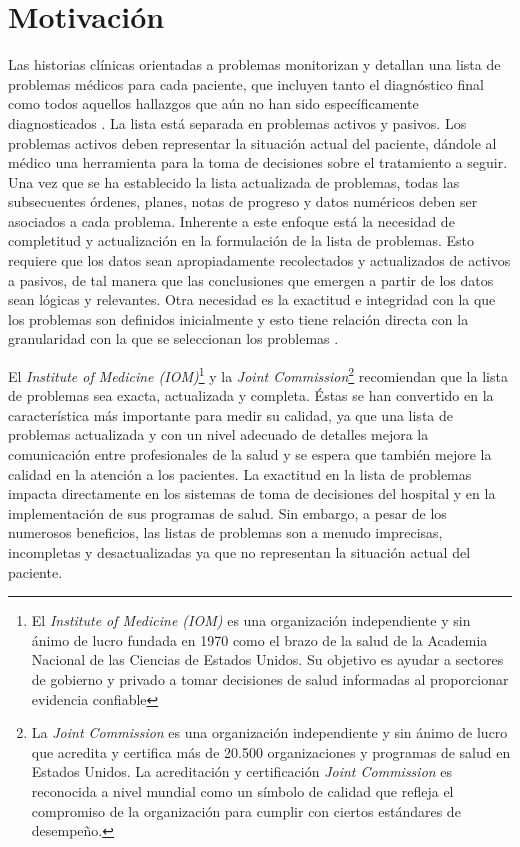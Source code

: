 \section{Motivación}
Las historias clínicas orientadas a problemas monitorizan y detallan una lista de problemas médicos para cada paciente, que incluyen  tanto el diagnóstico final como todos aquellos hallazgos que aún no han sido específicamente diagnosticados \cite{Weed1968}. La lista está separada en problemas activos y pasivos. Los problemas activos deben representar la situación actual del paciente, dándole al médico una herramienta para la toma de decisiones sobre el tratamiento a seguir. Una vez que se ha establecido la lista actualizada de problemas, todas las subsecuentes órdenes, planes, notas de progreso y datos numéricos deben ser asociados a cada problema. Inherente a este enfoque está la necesidad de completitud y actualización en la formulación de la lista de  problemas. Esto requiere que los datos sean apropiadamente recolectados y actualizados de activos a pasivos, de tal manera que las conclusiones que emergen a partir de los datos sean lógicas y relevantes. Otra necesidad es la exactitud e integridad con la que los problemas son definidos inicialmente y esto tiene relación directa con la granularidad con la que se seleccionan los problemas \cite{Luna2013}. 
 
El \textit{Institute of Medicine (IOM)}\footnote{El \textit{Institute of Medicine (IOM)} es una organización independiente y sin ánimo de lucro fundada en 1970 como el brazo de la salud de la Academia Nacional de las Ciencias de Estados Unidos. Su objetivo es ayudar a sectores de gobierno y privado a tomar decisiones de salud informadas al proporcionar evidencia confiable} y la \textit{Joint Commission}\footnote{La \textit{Joint Commission} es una organización independiente y sin ánimo de lucro que acredita y certifica más de 20.500 organizaciones y programas de salud en Estados Unidos. La acreditación y certificación \textit{Joint Commission} es reconocida a nivel mundial como un símbolo de calidad que refleja el compromiso de la organización para cumplir con ciertos estándares de desempeño.} recomiendan que la lista de problemas sea exacta, actualizada y completa. Éstas se han convertido en la característica más importante para medir su calidad, ya que una lista de problemas actualizada y con un nivel adecuado de detalles mejora la comunicación entre profesionales de la salud y se espera que también mejore la calidad en la atención a los pacientes. La exactitud en la lista de problemas impacta directamente en los sistemas de toma de decisiones del hospital y en la implementación de sus  programas de salud. Sin embargo, a pesar de los numerosos beneficios, las listas de problemas son a menudo imprecisas, incompletas y desactualizadas ya que no representan la situación actual del paciente.
 
